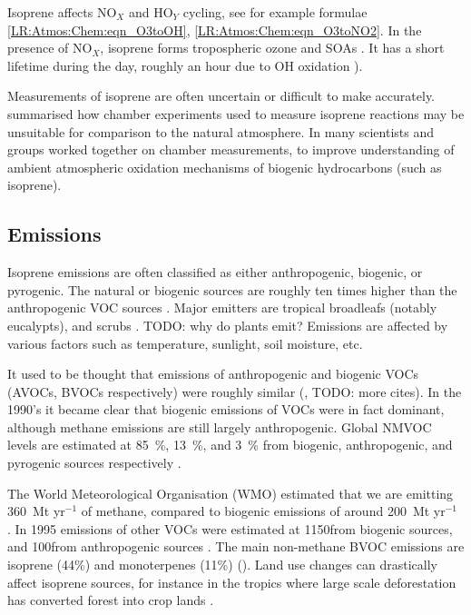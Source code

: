     Isoprene affects NO$_X$ and HO$_Y$ cycling, see for example formulae \ref{LR:Atmos:Chem:eqn_O3toOH}, \ref{LR:Atmos:Chem:eqn_O3toNO2}.
    In the presence of NO$_X$, isoprene forms tropospheric ozone and SOAs \citep{Wagner2002, Millet2006}.
    It has a short lifetime during the day, roughly an hour due to OH oxidation \citep{AtkinsonArey2003}).
    
    
    Measurements of isoprene are often uncertain or difficult to make accurately.
    \cite{Kanakidou2005} summarised how chamber experiments used to measure isoprene reactions may be unsuitable for comparison to the natural atmosphere.
    In \cite{Nguyen2014} many scientists and groups worked together on chamber measurements, to improve understanding of ambient atmospheric oxidation mechanisms of biogenic hydrocarbons (such as isoprene).
    
    
  \subsection{Emissions}
  \label{LR:VOCs:Emissions}
    
    
    Isoprene emissions are often classified as either anthropogenic, biogenic, or pyrogenic.
    The natural or biogenic sources are roughly ten times higher than the anthropogenic VOC sources \citep{Guenther2006, Kanakidou2005}.
    Major emitters are tropical broadleafs (notably eucalypts), and scrubs \citep{Guenther2006, Arneth2008, Niinemets2010, Monks2015}.
    TODO: why do plants emit?
    Emissions are affected by various factors such as temperature, sunlight, soil moisture, etc.
    
    It used to be thought that emissions of anthropogenic and biogenic VOCs (AVOCs, BVOCs respectively) were roughly similar (\cite{Muller1992}, TODO: more cites).
    In the 1990's it became clear that biogenic emissions of VOCs were in fact dominant, although methane emissions are still largely anthropogenic. 
    Global NMVOC levels are estimated at 85~\%, 13~\%, and 3~\% from biogenic, anthropogenic, and pyrogenic sources respectively \citep{Kanakidou2005, Kefauver2014}.
    
    The World Meteorological Organisation (WMO) estimated that we are emitting 360~Mt yr$^{-1}$ of methane, compared to biogenic emissions of around 200~Mt yr$^{-1}$ \citep{Atkinson2000}.
    In 1995 emissions of other VOCs were estimated at 1150\tgcpyr from biogenic sources, and 100\tgcpyr from anthropogenic sources \citep{Guenther1995, Atkinson2000}.
    The main non-methane BVOC emissions are isoprene (44\%) and monoterpenes (11\%) (\cite{Guenther2000, Kefauver2014}). 
    Land use changes can drastically affect isoprene sources, for instance in the tropics where large scale deforestation has converted forest into crop lands \citep{Kanakidou2005}.

